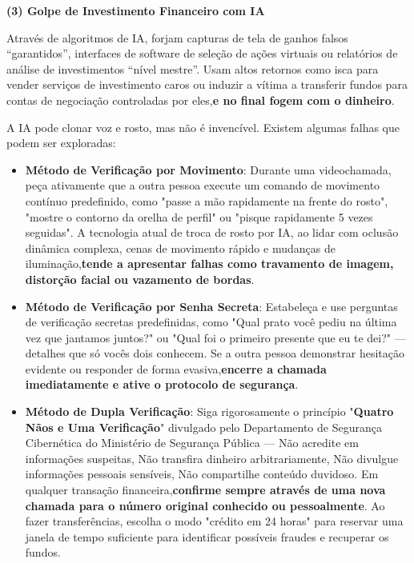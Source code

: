 \textbf{(3) Golpe de Investimento Financeiro com IA}\par

Através de algoritmos de IA, forjam capturas de tela de ganhos falsos “garantidos”, interfaces de software de seleção de ações virtuais ou relatórios de análise de investimentos “nível mestre”. Usam altos retornos como isca para vender serviços de investimento caros ou induzir a vítima a transferir fundos para contas de negociação controladas por eles,\textbf{e no final fogem com o dinheiro}.


A IA pode clonar voz e rosto, mas não é invencível. Existem algumas falhas que podem ser exploradas:

\begin{itemize}
  \item \textbf{Método de Verificação por Movimento}: Durante uma videochamada, peça ativamente que a outra pessoa execute um comando de movimento contínuo predefinido, como "passe a mão rapidamente na frente do rosto", "mostre o contorno da orelha de perfil" ou "pisque rapidamente 5 vezes seguidas". A tecnologia atual de troca de rosto por IA, ao lidar com oclusão dinâmica complexa, cenas de movimento rápido e mudanças de iluminação,\textbf{tende a apresentar falhas como travamento de imagem, distorção facial ou vazamento de bordas}.
  \item \textbf{Método de Verificação por Senha Secreta}: Estabeleça e use perguntas de verificação secretas predefinidas, como "Qual prato você pediu na última vez que jantamos juntos?" ou "Qual foi o primeiro presente que eu te dei?" — detalhes que só vocês dois conhecem. Se a outra pessoa demonstrar hesitação evidente ou responder de forma evasiva,\textbf{encerre a chamada imediatamente e ative o protocolo de segurança}.
  \item \textbf{Método de Dupla Verificação}: Siga rigorosamente o princípio "\textbf{Quatro Nãos e Uma Verificação}" divulgado pelo Departamento de Segurança Cibernética do Ministério de Segurança Pública — Não acredite em informações suspeitas, Não transfira dinheiro arbitrariamente, Não divulgue informações pessoais sensíveis, Não compartilhe conteúdo duvidoso. Em qualquer transação financeira,\textbf{confirme sempre através de uma nova chamada para o número original conhecido ou pessoalmente}. Ao fazer transferências, escolha o modo "crédito em 24 horas" para reservar uma janela de tempo suficiente para identificar possíveis fraudes e recuperar os fundos.
\end{itemize}

